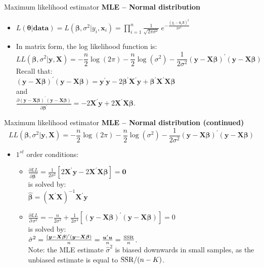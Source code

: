 \documentclass{beamer}
\begin{document}
\begin{frame}{Maximum likelihood estimator}
\textbf{MLE -- Normal distribution} \\ \bigskip
\begin{itemize}
    \item $L(\bm{\theta}|\textbf{data})=L(\bm{\beta},\sigma^2|y_i,\bm{x}_i)=
    \displaystyle\prod_{i=1}^n \frac{1}{\sqrt{2\pi\sigma^2}}~e^{-\frac{(y_i-\bm{x}_i\bm{\beta})^2}{2\sigma^2}}$
    \smallskip
    \item In matrix form, the log likelihood function is:
    \footnotesize{
    $$
    LL(\bm{\beta},\sigma^2|\bm{y},\bm{X})= - \frac{n}{2} \log(2\pi) - \frac{n}{2} \log(\sigma^2) - \frac{1}{2\sigma^2}(\bm{y}-\bm{X \beta})^{\prime}(\bm{y}-\bm{X \beta})
    $$
    } %
    Recall that:\\ \bigskip
    $(\bm{y}-\bm{X \beta})^{\prime}(\bm{y}-\bm{X \beta})=
    \bm{y}^{\prime}\bm{y} - 2\bm{\beta}^{\prime}\bm{X}^{\prime}\bm{y}+\bm{\beta}^{\prime}\bm{X}^{\prime}\bm{X \beta}$\\ \smallskip
    and \\ \medskip
    $\frac{\partial (\bm{y}-\bm{X \beta})^{\prime}(\bm{y}-\bm{X \beta})}{\partial \bm{\beta}^{\prime}} = -2\bm{X}^{\prime}\bm{y}+2\bm{X}^{\prime}\bm{X \beta}$.
\end{itemize}
\end{frame}
\begin{frame}{Maximum likelihood estimator}
\textbf{MLE -- Normal distribution (continued)} 
    $$
    LL(\bm{\beta},\sigma^2|\bm{y},\bm{X})= - \frac{n}{2} \log(2\pi) - \frac{n}{2} \log(\sigma^2) - \frac{1}{2\sigma^2}(\bm{y}-\bm{X \beta})^{\prime}(\bm{y}-\bm{X \beta})
    $$
\begin{itemize}
    \item $1^{st}$ order conditions:\\
    \medskip
    \begin{itemize}
        \item  $\frac{\partial LL}{\partial \bm{\beta}^{\prime}}=
    \frac{1}{2\sigma^2}[2\bm{X}^{\prime}\bm{y}-2\bm{X}^{\prime}\bm{X \beta}]=\bm{0}$\\ \medskip is solved by:\\ \medskip
    $\hat{\bm{\beta}} =(\bm{X}^{\prime}\bm{X})^{-1} \bm{X}^{\prime}\bm{y}$
    \bigskip
    \item $\frac{\partial LL}{\partial \, \sigma^2}=
    - \frac{n}{2\sigma^2}+\frac{1}{2\sigma^4}
    \left[ (\bm{y}-\bm{X \beta})^{\prime}(\bm{y}-\bm{X \beta}) \right] = 0$\\
    \medskip is solved by:\\ \medskip
    $\hat{\sigma}^2 = \frac{(\bm{y}-\bm{X \beta})^{\prime}(\bm{y}-\bm{X \beta})}{n} =  \frac{\bm{u}^{\prime}\bm{u}}{n} = \frac{\textnormal{SSR}}{n}$.\\ \medskip
    Note: the MLE estimate $\hat{\sigma}^2$ is biased downwards in small samples, as the unbiased estimate is equal to $\textnormal{SSR}/(n-K)$.
    \end{itemize}
\end{itemize}
\end{frame}
\end{document}

